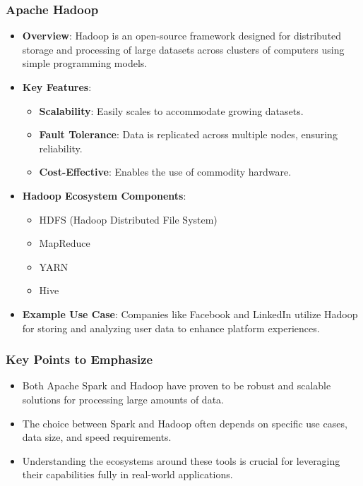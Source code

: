 \documentclass[aspectratio=169]{beamer}
\begin{document}
\begin{frame}[fragile]
    \frametitle{Apache Hadoop}

    \begin{itemize}
        \item \textbf{Overview}: 
        Hadoop is an open-source framework designed for distributed storage and processing of large datasets across clusters of computers using simple programming models.
        
        \item \textbf{Key Features}:
        \begin{itemize}
            \item \textbf{Scalability}: Easily scales to accommodate growing datasets.
            \item \textbf{Fault Tolerance}: Data is replicated across multiple nodes, ensuring reliability.
            \item \textbf{Cost-Effective}: Enables the use of commodity hardware.
        \end{itemize}
        
        \item \textbf{Hadoop Ecosystem Components}:
        \begin{itemize}
            \item HDFS (Hadoop Distributed File System)
            \item MapReduce
            \item YARN
            \item Hive
        \end{itemize}

        \item \textbf{Example Use Case}:
        Companies like Facebook and LinkedIn utilize Hadoop for storing and analyzing user data to enhance platform experiences.
    \end{itemize}
\end{frame}

\begin{frame}[fragile]
    \frametitle{Key Points to Emphasize}

    \begin{itemize}
        \item Both Apache Spark and Hadoop have proven to be robust and scalable solutions for processing large amounts of data.
        \item The choice between Spark and Hadoop often depends on specific use cases, data size, and speed requirements.
        \item Understanding the ecosystems around these tools is crucial for leveraging their capabilities fully in real-world applications.
    \end{itemize}
\end{frame}
\end{document}
